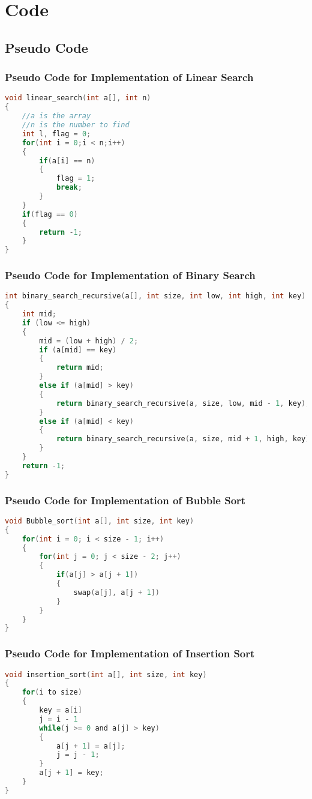 \documentclass[11pt]{article}
\begin{document}
\section{Code}
\subsection{Pseudo Code}

\subsubsection{Pseudo Code for Implementation of Linear Search}
\begin{lstlisting}[language=C]
void linear_search(int a[], int n)
{
	//a is the array
	//n is the number to find
	int l, flag = 0;
	for(int i = 0;i < n;i++)
	{
		if(a[i] == n)
		{
			flag = 1;
			break;
		}
	}
	if(flag == 0)
	{
		return -1;
	}
}
\end{lstlisting}
\subsubsection{Pseudo Code for Implementation of Binary Search}
\begin{lstlisting}[language=C]
int binary_search_recursive(a[], int size, int low, int high, int key)
{
	int mid;
	if (low <= high)
	{
		mid = (low + high) / 2;
		if (a[mid] == key)
		{
			return mid;
		}
		else if (a[mid] > key)
		{
			return binary_search_recursive(a, size, low, mid - 1, key);
		}
		else if (a[mid] < key)
		{
			return binary_search_recursive(a, size, mid + 1, high, key);
		}
	}
	return -1;
}
\end{lstlisting}
\subsubsection{Pseudo Code for Implementation of Bubble Sort}
\begin{lstlisting}[language=C]
void Bubble_sort(int a[], int size, int key)
{
	for(int i = 0; i < size - 1; i++)
	{
		for(int j = 0; j < size - 2; j++)
		{
			if(a[j] > a[j + 1])
			{
				swap(a[j], a[j + 1])
			}
		}
	}
}
\end{lstlisting}
\subsubsection{Pseudo Code for Implementation of Insertion Sort}
\begin{lstlisting}[language=C]
void insertion_sort(int a[], int size, int key)
{
	for(i to size)
	{
		key = a[i]
		j = i - 1
		while(j >= 0 and a[j] > key)
		{
			a[j + 1] = a[j];
			j = j - 1;
		}
		a[j + 1] = key;
	}
}
\end{lstlisting}
\end{document}
